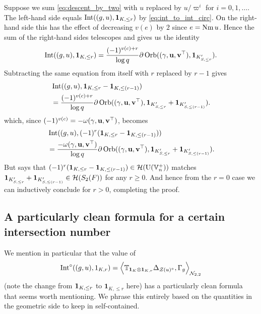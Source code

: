 Suppose we sum \eqref{eq:descent_by_two} with $u$ replaced by
$u/\varpi^i$ for $i = 0, 1, \dots$.
The left-hand side equals $\operatorname{Int}((g,u), \mathbf{1}_{K, \le r})$ by \eqref{eq:int_to_int_circ}.
On the right-hand side this has the effect of decreasing $v(e)$ by $2$ since $e = \operatorname{Nm} u$.
Hence the sum of the right-hand sides telescopes and gives us the identity
\begin{equation}
  \operatorname{Int}((g,u), \mathbf{1}_{K, \le r})
  = \frac{(-1)^{v(c)+r}}{\log q}
    \partial\operatorname{Orb}({(\gamma, \mathbf u, \mathbf v^\top)}, \mathbf{1}_{K'_{S, \le r}}).
  \label{eq:match_penultimate}
\end{equation}
Subtracting the same equation from itself with $r$ replaced by $r-1$ gives
\begin{align*}
  &\operatorname{Int}((g,u), \mathbf{1}_{K, \le r} - \mathbf{1}_{K, \le (r-1)}) \\
  &= \frac{(-1)^{v(c)+r}}{\log q}
    \partial \operatorname{Orb}({(\gamma, \mathbf u, \mathbf v^\top)}, \mathbf{1}_{K'_{S, \le r}} + \mathbf{1}_{K'_{S, \le (r-1)}}).
\end{align*}
which, since $(-1)^{v(c)} = -\omega{(\gamma, \mathbf u, \mathbf v^\top)}$, becomes
\begin{equation}
  \begin{aligned}
    &\operatorname{Int}((g,u), (-1)^r(\mathbf{1}_{K, \le r} - \mathbf{1}_{K, \le (r-1)})) \\
    &= \frac{-\omega{(\gamma, \mathbf u, \mathbf v^\top)}}{\log q}
    \partial \operatorname{Orb}({(\gamma, \mathbf u, \mathbf v^\top)}, \mathbf{1}_{K'_{S, \le r}} + \mathbf{1}_{K'_{S, \le (r-1)}}).
  \end{aligned}
  \label{eq:match_final}
\end{equation}
But  says that
$(-1)^r(\mathbf{1}_{K, \le r} - \mathbf{1}_{K, \le (r-1)}) \in \mathcal H(\operatorname{U}(\mathbb V_n^+))$
matches $\mathbf{1}_{K'_{S, \le r}} + \mathbf{1}_{K'_{S, \le (r-1)}} \in \mathcal H(S_2(F))$
for any $r \ge 0$.
And hence from the $r = 0$ case we can inductively conclude
 for $r > 0$, completing the proof.

\subsection{A particularly clean formula for a certain intersection number}
We mention in particular that the value of
\[ \operatorname{Int}^\circ((g,u), 1_{K,r})
  = \Big\langle \mathbb{T}_{\mathbf{1}_K \otimes \mathbf{1}_{K, r}}
    \Delta_{\mathcal Z(u)^\circ}, \Gamma_g \Big\rangle_{\mathcal N_{2,2}} \]
(note the change from $\mathbf{1}_{K, \le r}$ to $\mathbf{1}_{K, \le r}$ here)
has a particularly clean formula that seems worth mentioning.
We phrase this entirely based on the quantities in the geometric side to keep in self-contained.

